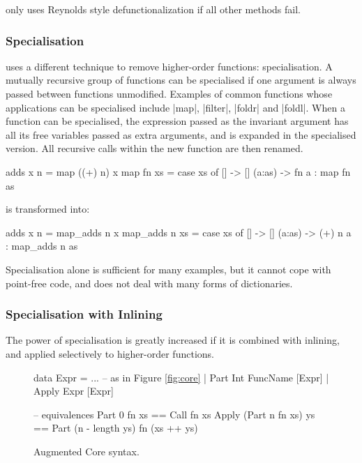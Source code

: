 \catch{} only uses Reynolds style defunctionalization if all other methods fail.


\subsubsection{Specialisation}

\oldtool{} uses a different technique to remove higher-order functions: specialisation. A mutually recursive group of functions can be specialised if one argument is always passed between functions unmodified. Examples of common functions whose applications can be specialised include |map|, |filter|, |foldr| and |foldl|. When a function can be specialised, the expression passed as the invariant argument has all its free variables passed as extra arguments, and is expanded in the specialised version. All recursive calls within the new function are then renamed.

\begin{example}
\begin{code}
adds x n = map ((+) n) x
map fn xs =  case  xs of
             []      -> []
             (a:as)  -> fn a : map fn as
\end{code}

\noindent is transformed into:

\begin{code}
adds x n = map_adds n x
map_adds n xs =  case  xs of
                 []      -> []
                 (a:as)  -> (+) n a : map_adds n as
\end{code}\codeexample
\end{example}

Specialisation alone is sufficient for many examples, but it cannot cope with point-free code, and does not deal with many forms of dictionaries.

\subsubsection{Specialisation with Inlining}

The power of specialisation is greatly increased if it is combined with inlining, and applied selectively to higher-order functions.

\begin{figure}
\ignore\begin{code}
data Expr  =  ... -- as in Figure {\ref{fig:core}}
           |  Part   Int FuncName [Expr]
           |  Apply  Expr [Expr]

-- equivalences
Part 0 fn xs == Call fn xs
Apply (Part n fn xs) ys == Part (n - length ys) fn (xs ++ ys)
\end{code}
\caption{Augmented Core syntax.}
\label{fig:core_ho}
\end{figure}

